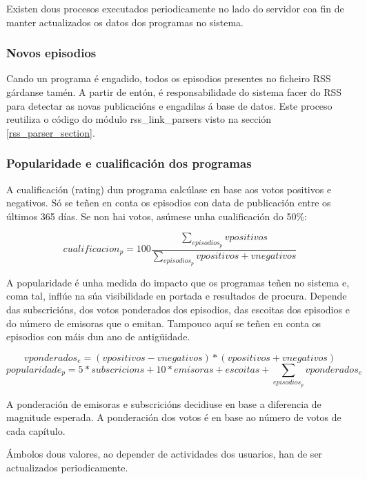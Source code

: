 Existen dous procesos executados periodicamente no lado do servidor coa fin de manter actualizados os datos dos programas no sistema.

\subsubsection{Novos episodios}

Cando un programa é engadido, todos os episodios presentes no ficheiro RSS gárdanse tamén. A partir de entón, é responsabilidade do sistema facer  do RSS para detectar as novas publicacións e engadilas á base de datos. Este proceso reutiliza o código do módulo rss\_link\_parsers visto na sección \ref{rss_parser_section}.

\subsubsection{Popularidade e cualificación dos programas}

A cualificación (rating) dun programa calcúlase en base aos votos positivos e negativos. Só se teñen en conta os episodios con data de publicación entre os últimos 365 días. Se non hai votos, asúmese unha cualificación do 50\%:

\[cualificacion_{p}=100\frac{\sum_{episodios_p}vpositivos}{\sum_{episodios_p}vpositivos+vnegativos}\]

A popularidade é unha medida do impacto que os programas teñen no sistema e, coma tal, inflúe na súa visibilidade en portada e resultados de procura. Depende das subscricións, dos votos ponderados dos episodios, das escoitas dos episodios e do número de emisoras que o emitan. Tampouco aquí se teñen en conta os episodios con máis dun ano de antigüidade.

\[vponderados_e=(vpositivos-vnegativos)*(vpositivos+vnegativos)\]
\[popularidade_{p}=5*subscricions+10*emisoras+escoitas+\sum_{episodios_p}vponderados_e\]

A ponderación de emisoras e subscricións decidiuse en base a diferencia de magnitude esperada. A ponderación dos votos é en base ao número de votos de cada capítulo.

Ámbolos dous valores, ao depender de actividades dos usuarios, han de ser actualizados periodicamente.


